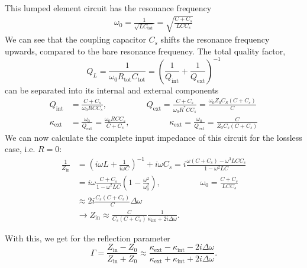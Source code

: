 This lumped element circuit has the resonance frequency
\begin{align}
\omega_0 = \frac{1}{\sqrt{LC_\mathrm{tot}}} = \sqrt{\frac{C+C_s}{L C C_s}}
\end{align}
We can see that the coupling capacitor $C_s$ shifts the resonance frequency upwards, compared to the bare resonance frequency.
The total quality factor,
\begin{equation}
Q_L = \frac{1}{\omega_0 R_\mathrm{tot}C_\mathrm{tot}} = \left(\frac{1}{Q_\mathrm{int}} + \frac{1}{Q_\mathrm{ext}}\right)^{-1}
\end{equation}
can be separated into its internal and external components
\begin{align}
Q_\mathrm{int} &= \frac{C+C_s}{\omega_0 R C C_s}, \hspace{2cm} Q_\mathrm{ext} = \frac{C+C_s}{\omega_0 R^* C C_s} = \frac{\omega_0 Z_0 C_S (C+C_s)}{C} \\%
\kappa_\mathrm{ext} &= \frac{\omega_0}{Q_\mathrm{ext}} = \frac{\omega_0 R C C_s}{C+C_s}, \hspace{2cm} \kappa_\mathrm{ext} = \frac{\omega_0}{Q_\mathrm{ext}} = \frac{C}{Z_0 C_s (C+C_s)}
\end{align}
We can now calculate the complete input impedance of this circuit for the lossless case, i.e. $R=0$:
\begin{align}
\frac{1}{Z_\mathrm{in}}&=\left(i\omega L + \frac{1}{i\omega C}\right)^{-1} + i\omega C_s = i\frac{\omega(C+C_s)-\omega^3LCC_s}{1-\omega^2LC} \\%
&=i\omega\frac{C+C_s}{1-\omega^2LC}\left(1-\frac{\omega^2}{\omega_0^2}\right), \hspace{2cm} \omega_0=\frac{C+C_s}{LCC_s} \\%
&\approx2i\frac{C_s(C+C_s)}{C}\Delta\omega \\%
&\longrightarrow Z_\mathrm{in} \approx \frac{C}{C_s (C+C_s)}\frac{1}{\kappa_\mathrm{int}+2i\Delta\omega}.
\end{align}

With this, we get for the reflection parameter
\begin{equation}
\Gamma = \frac{Z_\mathrm{in}-Z_0}{Z_\mathrm{in}+Z_0}\approx\frac{\kappa_\mathrm{ext}-\kappa_\mathrm{int}-2i\Delta\omega}{\kappa_\mathrm{ext}+\kappa_\mathrm{int}+2i\Delta\omega}.
\end{equation}

